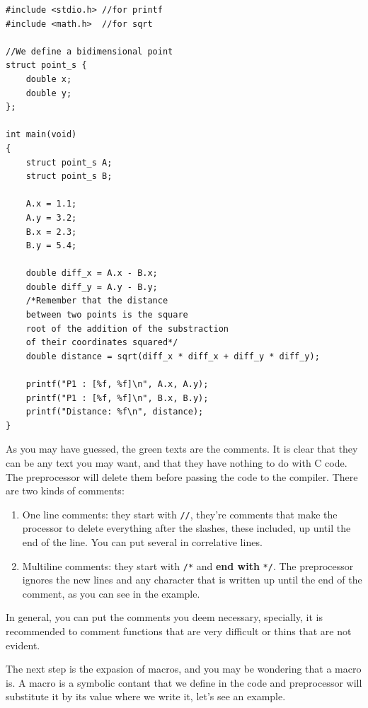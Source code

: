 \documentclass[a4paper]{article}
\begin{document}
\noindent
\begin{minipage}[H]{\linewidth}
\mbox{}
\begin{lstlisting}[style=C,
caption={Example of program with comments},
label={lst:comments1}]
#include <stdio.h> //for printf
#include <math.h>  //for sqrt

//We define a bidimensional point
struct point_s {
    double x;
    double y;
};

int main(void)
{
    struct point_s A;
    struct point_s B;

    A.x = 1.1;
    A.y = 3.2;
    B.x = 2.3;
    B.y = 5.4;

    double diff_x = A.x - B.x;
    double diff_y = A.y - B.y;
    /*Remember that the distance
    between two points is the square
    root of the addition of the substraction
    of their coordinates squared*/
    double distance = sqrt(diff_x * diff_x + diff_y * diff_y);

    printf("P1 : [%f, %f]\n", A.x, A.y);
    printf("P1 : [%f, %f]\n", B.x, B.y);
    printf("Distance: %f\n", distance);
}
\end{lstlisting}
\end{minipage}

As you may have guessed, the green texts are the comments. It is clear that they
can be any text you may want, and that they have nothing to do with C code.
The preprocessor will delete them before passing the code to the compiler.
There are two kinds of comments:
\begin{enumerate}
\item One line comments: they start with \verb!//!, they're comments that
make the processor to delete everything after the slashes, these included, up
until the end of the line. You can put several in correlative lines.
\item Multiline comments: they start with \verb!/*! and \textbf{end with}
\verb!*/!. The preprocessor ignores the new lines and any character that is
written up until the end of the comment, as you can see in the example.
\end{enumerate}

In general, you can put the comments you deem necessary, specially, it is
recommended to comment functions that are very difficult or thins that are not
evident.

The next step is the expasion of macros, and you may be wondering that a macro
is. A macro is a symbolic contant that we define in the code and preprocessor
will substitute it by its value where we write it, let's see an example.
\end{document}
